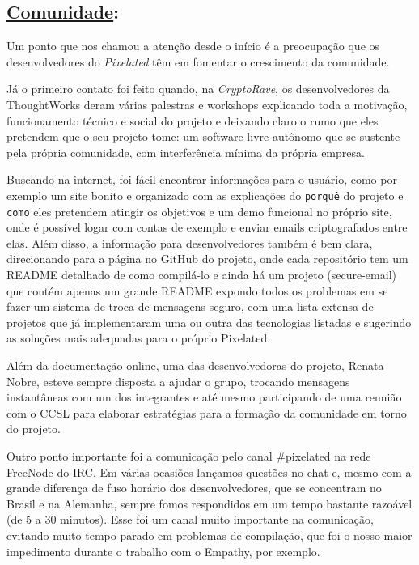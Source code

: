 \subsection*{\underline{Comunidade}:}

Um ponto que nos chamou a atenção desde o início é a preocupação que os
desenvolvedores do \emph{Pixelated} têm em fomentar o crescimento da comunidade.

Já o primeiro contato foi feito quando, na \emph{CryptoRave}, os desenvolvedores
da
ThoughtWorks deram várias palestras e workshops explicando toda a motivação,
funcionamento técnico e social do projeto e deixando claro o rumo que eles
pretendem que o seu projeto tome: um software livre autônomo que se sustente
pela
própria comunidade, com interferência mínima da própria empresa.

Buscando na internet, foi fácil encontrar informações para o usuário, como por
exemplo
um site bonito e organizado com as explicações do \texttt{porquê} do projeto e
\texttt{como} eles pretendem atingir os objetivos e um demo funcional no próprio
site, onde é possível logar com contas de exemplo e enviar emails
criptografados entre elas.
Além disso, a informação para desenvolvedores também é bem clara, direcionando
para a página no GitHub do projeto, onde cada repositório tem um README detalhado
de como compilá-lo e ainda há um projeto (secure-email) que contém apenas um
grande README expondo todos os problemas em se fazer um sistema de troca de
mensagens seguro, com uma lista extensa de projetos que já implementaram uma ou
outra das tecnologias listadas e sugerindo as soluções mais adequadas para o
próprio Pixelated.

Além da documentação online, uma das desenvolvedoras do projeto, Renata Nobre,
esteve sempre disposta a ajudar o grupo, trocando mensagens instantâneas com um
dos integrantes e até mesmo participando de uma reunião com o CCSL para elaborar
estratégias para a formação da comunidade em torno do projeto.

Outro ponto importante foi a comunicação pelo canal \#pixelated na rede FreeNode
do IRC. Em várias ocasiões lançamos questões no chat e, mesmo com a grande
diferença de fuso horário dos desenvolvedores, que se concentram no Brasil e na
Alemanha, sempre fomos respondidos em um tempo bastante razoável
(de 5 a 30 minutos). Esse foi um canal muito importante na comunicação, evitando
muito tempo parado em problemas de compilação, que foi o nosso maior impedimento
durante o trabalho com o Empathy, por exemplo.

